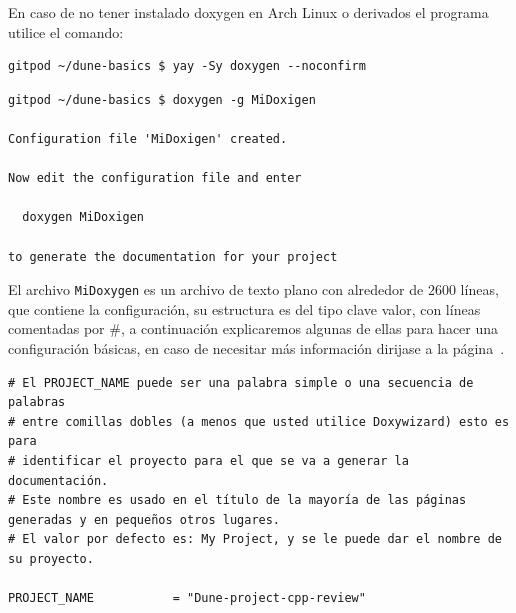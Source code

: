 \begin{frame}[fragile]\LARGE
	En caso de no tener instalado doxygen en Arch Linux o derivados el programa utilice el comando:
	\begin{lstlisting}
gitpod ~/dune-basics $ yay -Sy doxygen --noconfirm
\end{lstlisting}

	\begin{lstlisting}
gitpod ~/dune-basics $ doxygen -g MiDoxigen

Configuration file 'MiDoxigen' created.

Now edit the configuration file and enter

  doxygen MiDoxigen

to generate the documentation for your project
\end{lstlisting}
\end{frame}

\begin{frame}
	El archivo \lstinline{MiDoxygen} es un archivo de texto plano con
	alrededor de $2600$ líneas, que contiene la configuración, su
	estructura es del tipo clave valor, con líneas comentadas por \#, a
	continuación explicaremos algunas de ellas para hacer una
	configuración básicas, en caso de necesitar más información dirijase
	a la página~\cite{Doxygen2021}.%
\end{frame}

\begin{frame}[fragile]\LARGE
	\begin{lstlisting}
# El PROJECT_NAME puede ser una palabra simple o una secuencia de palabras 
# entre comillas dobles (a menos que usted utilice Doxywizard) esto es para 
# identificar el proyecto para el que se va a generar la documentación.
# Este nombre es usado en el título de la mayoría de las páginas generadas y en pequeños otros lugares.
# El valor por defecto es: My Project, y se le puede dar el nombre de su proyecto.

PROJECT_NAME           = "Dune-project-cpp-review"
\end{lstlisting}
\end{frame}

